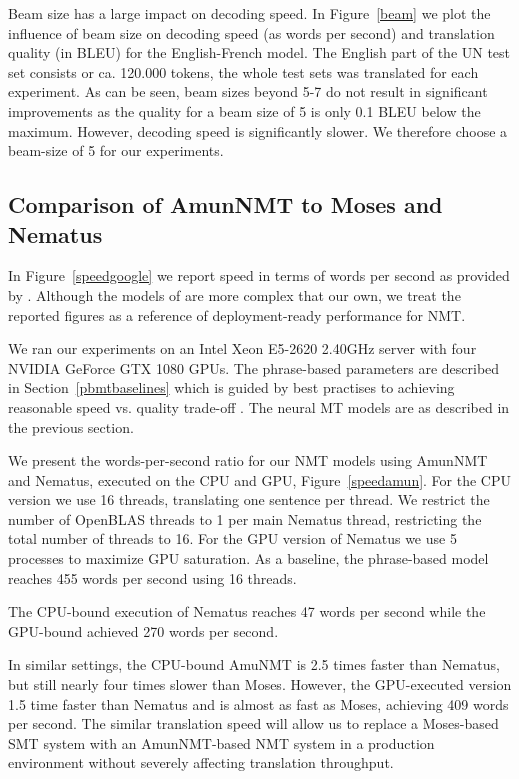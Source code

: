 \documentclass[11pt]{article}
\begin{document}
Beam size has a large impact on decoding speed. In Figure~\ref{beam} we plot the influence of beam size on decoding speed (as words per second) and translation quality (in BLEU) for the English-French model. The English part of the UN test set consists or ca. 120.000 tokens, the whole test sets was translated for each experiment. As can be seen, beam sizes beyond 5-7 do not result in significant improvements as the quality for a beam size of 5 is only 0.1 BLEU below the maximum. However, decoding speed is significantly slower. We therefore choose a beam-size of 5 for our experiments.  

\subsection{Comparison of AmunNMT to Moses and Nematus}

In Figure~\ref{speedgoogle} we report speed in terms of words per second as provided by . Although the models of  are more complex that our own, we treat the reported figures as a reference of deployment-ready performance for NMT. 

We ran our experiments on an Intel Xeon E5-2620 2.40GHz server with four NVIDIA GeForce GTX 1080 GPUs. The phrase-based parameters are described in Section~\ref{pbmtbaselines} which is guided by best practises to achieving reasonable speed vs. quality trade-off \cite{junczys_mtsummit_2013}. The neural MT models are as described in the previous section.

We present the words-per-second ratio for our NMT models using AmunNMT and Nematus, executed on the CPU and GPU, Figure~\ref{speedamun}. For the CPU version we use 16 threads, translating one sentence per thread. We restrict the number of OpenBLAS threads to 1 per main Nematus thread, restricting the total number of threads to 16. For the GPU version of Nematus we use 5 processes to maximize GPU saturation. As a baseline, the phrase-based model reaches 455 words per second using 16 threads.

The CPU-bound execution of Nematus reaches 47 words per second while the GPU-bound achieved 270 words per second. 

In similar settings, the CPU-bound AmuNMT is 2.5 times faster than Nematus, but still nearly four times slower than Moses. However, the GPU-executed version 1.5 time faster than Nematus and is almost as fast as Moses, achieving 409 words per second. The similar translation speed will allow us to replace a Moses-based SMT system with an AmunNMT-based NMT system in a production environment without severely affecting translation throughput. 
\end{document}
